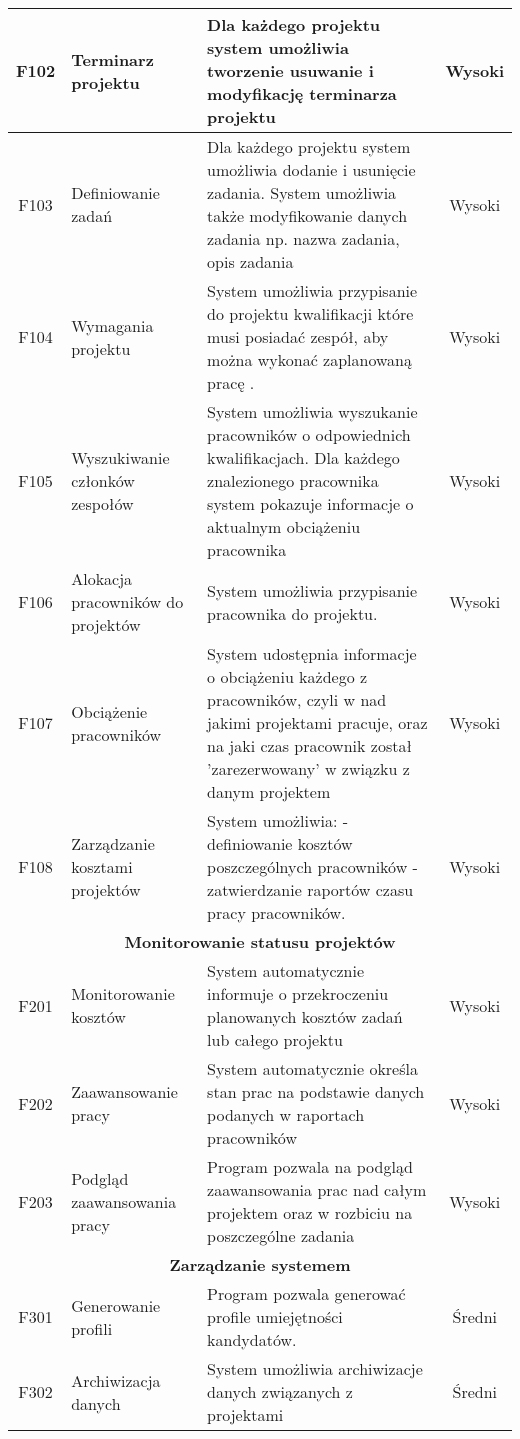 \begin{tabularx}{\textwidth}{|c|X|X|c|}
\hline
F102 & Terminarz projektu & Dla każdego projektu system umożliwia tworzenie usuwanie i modyfikację terminarza projektu & Wysoki \\
\hline 
F103 & Definiowanie zadań & Dla każdego projektu system umożliwia dodanie i usunięcie zadania. System umożliwia także modyfikowanie danych zadania np. nazwa zadania, opis zadania & Wysoki \\ 
\hline 
F104 & Wymagania projektu & System umożliwia przypisanie do projektu kwalifikacji które musi posiadać zespół, aby można wykonać zaplanowaną pracę . & Wysoki \\ 
\hline 
F105 & Wyszukiwanie członków zespołów & System umożliwia wyszukanie pracowników o odpowiednich kwalifikacjach. Dla każdego znalezionego pracownika system pokazuje informacje o aktualnym obciążeniu pracownika& Wysoki \\ 
\hline 
F106 & Alokacja pracowników do projektów & System umożliwia przypisanie pracownika do projektu. & Wysoki \\ 
\hline 
F107 & Obciążenie pracowników & System udostępnia informacje o obciążeniu każdego z pracowników, czyli w nad jakimi projektami pracuje, oraz na jaki czas pracownik został 'zarezerwowany' w związku z danym projektem & Wysoki \\ 
\hline 
F108 & Zarządzanie kosztami projektów & System umożliwia: \newline
- definiowanie kosztów poszczególnych pracowników \newline
- zatwierdzanie raportów czasu pracy pracowników. & Wysoki \\
\hline
\multicolumn{4}{|c|}{\textbf{Monitorowanie statusu projektów}} \\
\hline 
F201 & Monitorowanie kosztów & System automatycznie informuje o przekroczeniu planowanych kosztów zadań lub całego projektu & Wysoki \\ 
\hline 
F202 & Zaawansowanie pracy & System automatycznie określa stan prac na podstawie danych podanych w raportach pracowników & Wysoki \\
\hline 
F203 & Podgląd zaawansowania pracy & Program pozwala na podgląd zaawansowania prac nad całym projektem oraz w rozbiciu na poszczególne zadania & Wysoki \\
\hline 
\multicolumn{4}{|c|}{\textbf{Zarządzanie systemem}} \\
\hline 
F301 & Generowanie profili & Program pozwala generować profile umiejętności kandydatów.  & Średni \\ 
\hline
F302 & Archiwizacja danych & System umożliwia archiwizacje danych związanych z projektami & Średni \\ 
\hline

\end{tabularx} 

